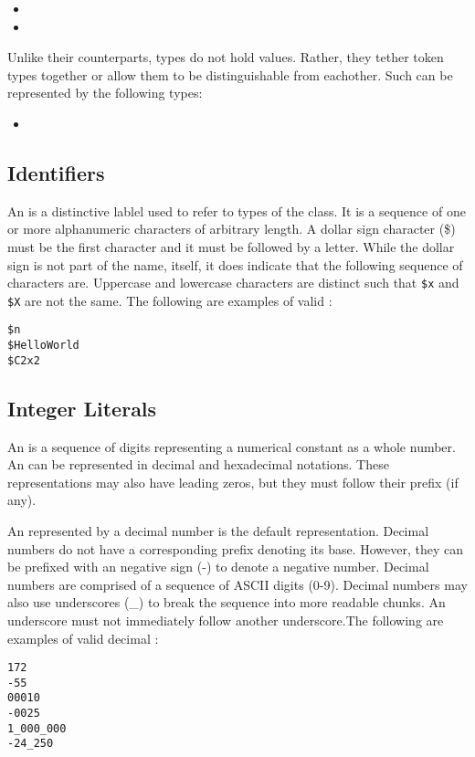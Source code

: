 \begin{itemize}
    \item {}
    \item {}
\end{itemize}

Unlike their counterparts,  types do not hold values. 
Rather, they tether  token types together or allow them to 
be distinguishable from eachother. Such  can be 
represented by the following types:

\begin{itemize}
    \item {}
\end{itemize}

\subsection{Identifiers}

An  is a distinctive lablel used to refer to 
 types of the  class. It is a 
sequence of one or more alphanumeric characters of arbitrary length. A dollar 
sign character (\$) must be the first character and it must be followed by a 
letter. While the dollar sign is not part of the  
name, itself, it does indicate that the following sequence of 
 characters are. Uppercase and lowercase characters are 
distinct such that \lstinline[language=grid]!$x! and 
\lstinline[language=grid]!$X! are not the same. The following are examples of 
valid :

\begin{lstlisting}[language=grid]
$n
$HelloWorld
$C2x2
\end{lstlisting}

\subsection{Integer Literals}

An  is a sequence of digits representing a 
numerical constant as a whole number. An  can 
be represented in decimal and hexadecimal notations. These 
representations may also have leading zeros, but they must follow their prefix 
(if any).

An  represented by a decimal number is the 
default representation. Decimal numbers do not have a corresponding prefix 
denoting its base. However, they can be prefixed with an negative sign (-) to 
denote a negative number. Decimal numbers are comprised of a sequence of ASCII 
digits (0-9). Decimal numbers may also use underscores (\_) to break the 
sequence into more readable chunks. An underscore must not immediately follow 
another underscore.The following are examples of valid decimal 
:

\begin{lstlisting}[language=grid]
172
-55
00010
-0025
1_000_000
-24_250
\end{lstlisting}
